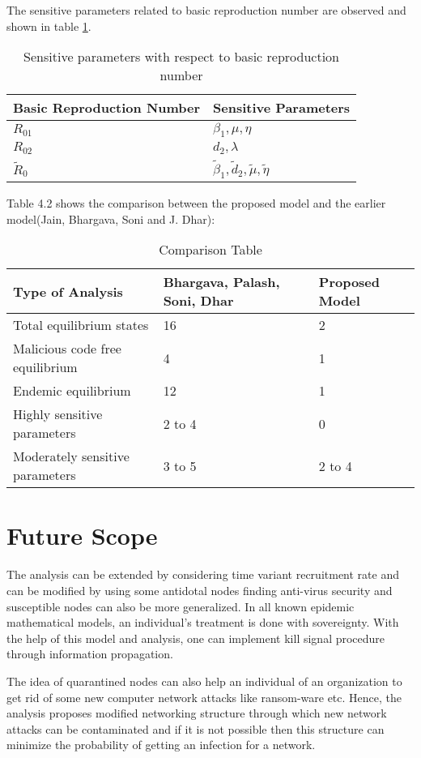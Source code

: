 \par The sensitive parameters related to
basic reproduction number are observed and shown in table \ref{rep}.
\begin{center}
\begin{table}[h]
\label{rep}
\begin{tabular}{|p{6 cm}|p{6 cm}|}
\hline
\bf Basic Reproduction Number &\bf  Sensitive Parameters \\
\hline
$R_{01}$ &$\beta_1, \mu, \eta$\\
$R_{02}$ & $ d_2, \lambda$\\
$\tilde R_0$ &$\tilde \beta_1,\tilde d_2,\tilde \mu,\tilde \eta$\\
\hline
\end{tabular}
\caption{Sensitive parameters with respect to basic reproduction number}
\end{table}
\end{center}

\par Table  4.2  shows the comparison between the proposed model and the earlier model(Jain, Bhargava, Soni and J. Dhar):
\begin{center}
\begin{table}[h]
\label{comp}
\begin{tabular}{|p{6 cm}|p{3 cm}|p{2 cm}|}
\hline
\bf Type of Analysis &\bf  Bhargava, Palash, Soni, Dhar &\bf Proposed Model \\
\hline
Total equilibrium states& 16 & 2\\
Malicious code free equilibrium & 4 & 1\\
Endemic equilibrium & 12 & 1\\
Highly sensitive parameters& 2 to 4 & 0\\
Moderately sensitive parameters& 3 to 5 & 2 to 4\\
\hline
\end{tabular}
\caption{Comparison Table}
\end{table}
\end{center}


\section{ Future Scope}
The analysis can be extended by considering time variant recruitment rate and can be modified by using some antidotal nodes finding anti-virus security and susceptible nodes can also be more generalized. In all known epidemic mathematical models, an individual's treatment is done with sovereignty. With the help of this model and analysis, one can implement kill signal procedure through information propagation.
\par The idea of quarantined nodes can also help an individual of an organization to get rid of some new computer network attacks like ransom-ware etc. Hence, the analysis proposes modified networking structure through which new network attacks can be contaminated and if it is not possible then this structure can minimize the probability of getting an infection for a network. 